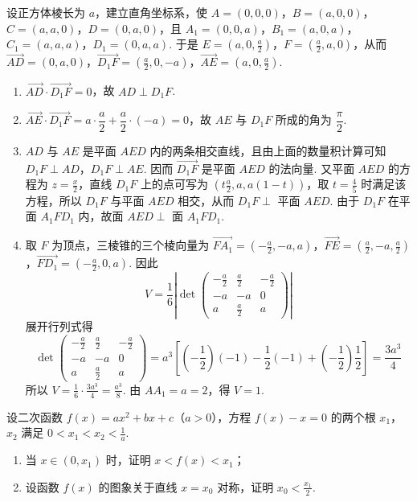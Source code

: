 \begin{solution}
设正方体棱长为 \(a\)，建立直角坐标系，使 \(A=(0,0,0)\)，\(B=(a,0,0)\)，\(C=(a,a,0)\)，\(D=(0,a,0)\)，且 \(A_{1}=(0,0,a)\)，\(B_{1}=(a,0,a)\)，\(C_{1}=(a,a,a)\)，\(D_{1}=(0,a,a)\).
于是 \(E=(a,0,\frac{a}{2})\)，\(F=(\frac{a}{2},a,0)\)，从而 \(\overrightarrow{AD}=(0,a,0)\)，\(\overrightarrow{D_{1}F}=(\frac{a}{2},0,-a)\)，\(\overrightarrow{AE}=(a,0,\frac{a}{2})\).
\begin{enumerate}
\item \(\overrightarrow{AD}\cdot\overrightarrow{D_{1}F}=0\)，故 \(AD\perp D_{1}F\).
\item \(\overrightarrow{AE}\cdot\overrightarrow{D_{1}F}=a\cdot\dfrac{a}{2}+\dfrac{a}{2}\cdot(-a)=0\)，故 \(AE\) 与 \(D_{1}F\) 所成的角为 \(\dfrac{\pi}{2}\).
\item \(AD\) 与 \(AE\) 是平面 \(AED\) 内的两条相交直线，且由上面的数量积计算可知 \(D_{1}F\perp AD\)，\(D_{1}F\perp AE\). 因而 \(\overrightarrow{D_{1}F}\) 是平面 \(AED\) 的法向量. 又平面 \(AED\) 的方程为 \(z=\frac{x}{2}\)，直线 \(D_{1}F\) 上的点可写为 \((t\frac{a}{2},a,a(1-t))\)，取 \(t=\frac{4}{5}\) 时满足该方程，所以 \(D_{1}F\) 与平面 \(AED\) 相交，从而 \(D_{1}F\perp\) 平面 \(AED\). 由于 \(D_{1}F\) 在平面 \(A_{1}FD_{1}\) 内，故面 \(AED\perp\) 面 \(A_{1}FD_{1}\).
\item 取 \(F\) 为顶点，三棱锥的三个棱向量为 \(\overrightarrow{FA_{1}}=\left(-\frac{a}{2},-a,a\right)\)，\(\overrightarrow{FE}=\left(\frac{a}{2},-a,\frac{a}{2}\right)\)，\(\overrightarrow{FD_{1}}=\left(-\frac{a}{2},0,a\right)\).
因此
\[
V=\frac{1}{6}\left|\det\begin{pmatrix}
-\frac{a}{2}&\frac{a}{2}&-\frac{a}{2}\\
-a&-a&0\\
a&\frac{a}{2}&a
\end{pmatrix}\right|
\]
展开行列式得
\[
\det\begin{pmatrix}
-\frac{a}{2}&\frac{a}{2}&-\frac{a}{2}\\
-a&-a&0\\
a&\frac{a}{2}&a
\end{pmatrix}
=a^{3}\left[\left(-\frac{1}{2}\right)(-1)-\frac{1}{2}(-1)+\left(-\frac{1}{2}\right)\frac{1}{2}\right]
=\frac{3a^{3}}{4}
\]
所以 \(V=\frac{1}{6}\cdot\frac{3a^{3}}{4}=\frac{a^{3}}{8}\).
由 \(AA_{1}=a=2\)，得 \(V=1\).
\end{enumerate}
\end{solution}

\begin{problem}
设二次函数 \(f(x) = ax^{2} + bx + c\)（\(a > 0\)），方程 \(f(x) - x = 0\) 的两个根 \(x_{1}\)，\(x_{2}\) 满足 \(0 < x_{1} < x_{2} < \frac{1}{a}\).

\begin{enumerate}
\item 当 \(x \in (0, x_{1})\) 时，证明 \(x < f(x) < x_{1}\)；

\item 设函数 \(f(x)\) 的图象关于直线 \(x = x_{0}\) 对称，证明 \(x_{0} < \frac{x_{1}}{2}\).
\end{enumerate}
\end{problem}


